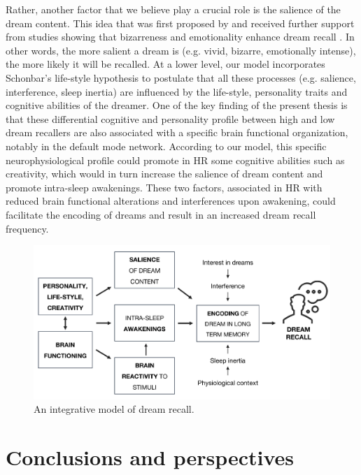 Rather, another factor that we believe play a crucial role is the salience of the dream content. This idea that was first proposed by \citet{cohen_test_1974} and received further support from studies showing that bizarreness and emotionality enhance dream recall \citep{cipolli_bizarreness_1993, schredl_emotions_1998}. In other words, the more salient a dream is (e.g. vivid, bizarre, emotionally intense), the more likely it will be recalled. At a lower level, our model incorporates Schonbar's life-style hypothesis \citeyearpar{schonbar_differential_1965} to postulate that all these processes (e.g. salience, interference, sleep inertia) are influenced by the life-style, personality traits and cognitive abilities of the dreamer. One of the key finding of the present thesis is that these differential cognitive and personality profile between high and low dream recallers are also associated with a specific brain functional organization, notably in the default mode network. According to our model, this specific neurophysiological profile could promote in HR some cognitive abilities such as creativity, which would in turn increase the salience of dream content and promote intra-sleep awakenings. These two factors, associated in HR with reduced brain functional alterations and interferences upon awakening, could facilitate the encoding of dreams and result in an increased dream recall frequency.

\begin{figure}[!htbp]
	\includegraphics[width=\textwidth]{Fig/Discussion/schema_dream_recall.png}
	\caption[An integrative model of dream recall]{An integrative model of dream recall.}
	\label{fig:disc:drf:model}
\end{figure}

\section{Conclusions and perspectives}
\label{disc:drf:perspectives}

